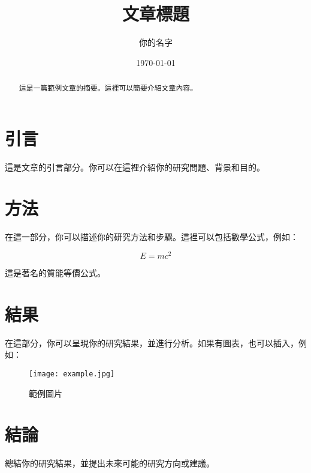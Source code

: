 \documentclass[12pt]{article} %
\title{文章標題}   %
\author{你的名字}   %
\date{\today}        %
\begin{document}
\maketitle   %

\begin{abstract}
這是一篇範例文章的摘要。這裡可以簡要介紹文章內容。
\end{abstract}

\section{引言}
這是文章的引言部分。你可以在這裡介紹你的研究問題、背景和目的。

\section{方法}
在這一部分，你可以描述你的研究方法和步驟。這裡可以包括數學公式，例如：

\begin{equation}
E = mc^2
\end{equation}

這是著名的質能等價公式。

\section{結果}
在這部分，你可以呈現你的研究結果，並進行分析。如果有圖表，也可以插入，例如：

\begin{figure}[h!]
\centering
\texttt{[image: example.jpg]}
\caption{範例圖片}
\end{figure}

\section{結論}
總結你的研究結果，並提出未來可能的研究方向或建議。
\end{document}
